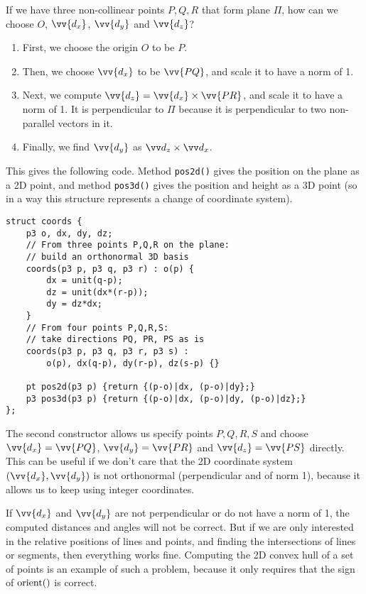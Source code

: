 
If we have three non-collinear points $P,Q,R$ that form plane $\Pi$, how can we choose $O$, $\vv{d_x}$, $\vv{d_y}$ and $\vv{d_z}$?
\begin{enumerate}
\item First, we choose the origin $O$ to be $P$.
\item Then, we choose $\vv{d_x}$ to be $\vv{PQ}$, and scale it to have a norm of 1.
\item Next, we compute $\vv{d_z} = \vv{d_x}\times\vv{PR}$, and scale it to have a norm of 1. It is perpendicular to $\Pi$ because it is perpendicular to two non-parallel vectors in it.
\item Finally, we find $\vv{d_y}$ as $\crossv{d_z}{d_x}$.
\end{enumerate} 

This gives the following code. Method \lstinline|pos2d()| gives the position on the plane as a 2D point, and method \lstinline|pos3d()| gives the position and height as a 3D point (so in a way this structure represents a change of coordinate system).
\begin{lstlisting}
struct coords {
    p3 o, dx, dy, dz;
    // From three points P,Q,R on the plane:
    // build an orthonormal 3D basis
    coords(p3 p, p3 q, p3 r) : o(p) {
        dx = unit(q-p);
        dz = unit(dx*(r-p));
        dy = dz*dx;
    }
    // From four points P,Q,R,S:
    // take directions PQ, PR, PS as is
    coords(p3 p, p3 q, p3 r, p3 s) :
        o(p), dx(q-p), dy(r-p), dz(s-p) {}
    
    pt pos2d(p3 p) {return {(p-o)|dx, (p-o)|dy};}
    p3 pos3d(p3 p) {return {(p-o)|dx, (p-o)|dy, (p-o)|dz};}
};
\end{lstlisting}

\begin{mathy}
The second constructor allows us specify points $P,Q,R,S$ and choose $\vv{d_x}=\vv{PQ}$, $\vv{d_y}=\vv{PR}$ and $\vv{d_z}=\vv{PS}$ directly. This can be useful if we don't care that the 2D coordinate system $(\vv{d_x},\vv{d_y})$ is not orthonormal (perpendicular and of norm 1), because it allows us to keep using integer coordinates.

If $\vv{d_x}$ and $\vv{d_y}$ are not perpendicular or do not have a norm of 1, the computed distances and angles will not be correct. But if we are only interested in the relative positions of lines and points, and finding the intersections of lines or segments, then everything works fine. Computing the 2D convex hull of a set of points is an example of such a problem, because it only requires that the sign of $\operatorname{orient}()$ is correct.
\end{mathy}
